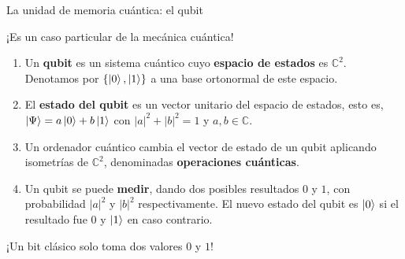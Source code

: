 \documentclass[11pt,compress]{beamer}
\begin{document}
\begin{frame}{La unidad de memoria cuántica: el qubit}

\begin{center}
{\color{TurkishRose}¡Es un caso particular de la mecánica cuántica!}
\end{center}

\begin{definition}
    \fontsize{10}{5}\selectfont

\begin{enumerate}
    \item Un \textbf{qubit} es un sistema cuántico cuyo \textbf{espacio de estados} es $\mathbb{C}^2$. Denotamos por $\{\ket{0}, \ket{1}\}$ a una base ortonormal de este espacio.
    \item El \textbf{estado del qubit} es un vector unitario del espacio de estados, esto es, $\ket{\Psi} = a \ket{0} + b \ket{1}$ con $|a|^2 + |b|^2 = 1$ y $a,b \in \mathbb{C}$.
    \item Un ordenador cuántico cambia el vector de estado de un qubit aplicando isometrías de $\mathbb{C}^2$, denominadas \textbf{operaciones cuánticas}.
    \item Un qubit se puede \textbf{medir}, dando dos posibles resultados $0$ y $1$, con probabilidad $|a|^2$ y $|b|^2$ respectivamente. El nuevo estado del qubit es $\ket{0}$ si el resultado fue $0$ y $\ket{1}$ en caso contrario.
\end{enumerate}
\end{definition}
  \begin{tcolorbox}[colback=ChetwodeBlue!10,colframe=ChetwodeBlue!60]
  \begin{center}
    {\color{TurkishRose}¡Un bit clásico solo toma dos valores $0$ y $1$!}
  \end{center}
  \end{tcolorbox}
\end{frame}
\end{document}
